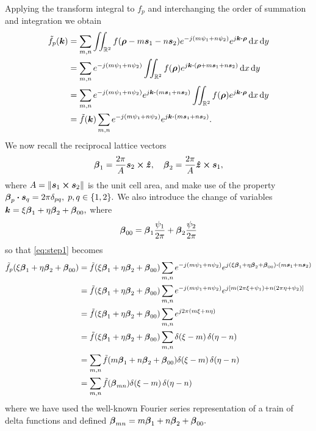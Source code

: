 Applying the transform integral to $f_p$ and interchanging the order
of summation and integration we obtain
\begin{align}
  \tilde{f}_p(\boldsymbol{k}) &= 
  \sum_{m,n} \iint_{\mathbb{R}^2} f(\boldsymbol{\rho}-m\boldsymbol{s}_1-n\boldsymbol{s}_2)
  e^{-j(m\psi_1+n\psi_2)} e^{j\boldsymbol{k}\boldsymbol{\cdot}\boldsymbol{\rho}}
  \, \text{d} x \, \text{d} y  \nonumber \\
  &= \sum_{m,n} e^{-j(m\psi_1+n\psi_2)} \iint_{\mathbb{R}^2} f(\boldsymbol{\rho})
  e^{j\boldsymbol{k}\boldsymbol{\cdot}(\boldsymbol{\rho}+m\boldsymbol{s}_1+n\boldsymbol{s}_2)}
  \, \text{d} x \, \text{d} y  \nonumber \\
  &= \sum_{m,n} e^{-j(m\psi_1+n\psi_2)} 
  e^{j\boldsymbol{k}\boldsymbol{\cdot}(m\boldsymbol{s}_1+n\boldsymbol{s}_2)}
  \iint_{\mathbb{R}^2} f(\boldsymbol{\rho})
  e^{j\boldsymbol{k}\boldsymbol{\cdot}\boldsymbol{\rho}}
  \, \text{d} x \, \text{d} y  \nonumber \\
  &= \tilde{f}(\boldsymbol{k}) \sum_{m,n} e^{-j(m\psi_1+n\psi_2)} 
  e^{j\boldsymbol{k}\boldsymbol{\cdot}(m\boldsymbol{s}_1+n\boldsymbol{s}_2)}.  \label{eq:step1}
\end{align}
We now recall the reciprocal lattice vectors 
\begin{equation}
  \boldsymbol{\beta}_1 = \frac{2\pi}{A} \boldsymbol{s}_2\boldsymbol{\times}\boldsymbol{\hat{z}}, \quad
  \boldsymbol{\beta}_2 = \frac{2\pi}{A} \boldsymbol{\hat{z}} \boldsymbol{\times} \boldsymbol{s}_1,
\end{equation}
where $A = \left\lVert\boldsymbol{s}_1 \boldsymbol{\times} \boldsymbol{s}_2\right\rVert$  is the unit cell area, and make
use of the property $\boldsymbol{\beta}_p \boldsymbol{\cdot} \boldsymbol{s}_q = 2\pi \delta_{pq}, \; p,q
\in \{1,2\}.$  We also introduce the change of variables $\boldsymbol{k} = \xi
\boldsymbol{\beta}_1 + \eta \boldsymbol{\beta}_2 + \boldsymbol{\beta}_{00},$ where
\begin{equation}
  \boldsymbol{\beta}_{00} = \boldsymbol{\beta}_1\frac{\psi_1}{2\pi}  + \boldsymbol{\beta}_2\frac{\psi_2}{2\pi} 
\end{equation}
 so that \eqref{eq:step1} becomes
\begin{align}
  \tilde{f}_p(\xi\boldsymbol{\beta}_1 + \eta\boldsymbol{\beta}_2 + \boldsymbol{\beta}_{00}) 
  &= \tilde{f}(\xi\boldsymbol{\beta}_1 + \eta\boldsymbol{\beta}_2 + \boldsymbol{\beta}_{00})  
  \sum_{m,n} e^{-j(m\psi_1+n\psi_2)} 
  e^{j(\xi\boldsymbol{\beta}_1 + \eta\boldsymbol{\beta}_2 + \boldsymbol{\beta}_{00})\boldsymbol{\cdot}(m\boldsymbol{s}_1+n\boldsymbol{s}_2)}
  \nonumber \\
  &= \tilde{f}(\xi\boldsymbol{\beta}_1 + \eta\boldsymbol{\beta}_2 + \boldsymbol{\beta}_{00})  
  \sum_{m,n} e^{-j(m\psi_1+n\psi_2)} 
  e^{j[m(2\pi\xi+\psi_1) + n(2\pi\eta+\psi_2)]}
   \nonumber \\
  &= \tilde{f}(\xi\boldsymbol{\beta}_1 + \eta\boldsymbol{\beta}_2+\boldsymbol{\beta}_{00})  
  \sum_{m,n} 
  e^{j2\pi(m\xi + n\eta)} \nonumber \\
  &= \tilde{f}(\xi\boldsymbol{\beta}_1 + \eta\boldsymbol{\beta}_2 + \boldsymbol{\beta}_{00})  
  \sum_{m,n} 
  \delta(\xi - m) \, \delta(\eta-n) \nonumber \\
  &=   \sum_{m,n} 
  \tilde{f}(m\boldsymbol{\beta}_1 + n\boldsymbol{\beta}_2 + \boldsymbol{\beta}_{00})  
  \delta(\xi - m) \, \delta(\eta-n) \nonumber \\
  &=   \sum_{m,n} 
  \tilde{f}(\boldsymbol{\beta}_{mn})  
  \delta(\xi - m) \, \delta(\eta-n)
  \label{eq:step3}
\end{align}
where we have used the well-known Fourier series representation of a
train of delta functions and defined $\boldsymbol{\beta}_{mn} = m\boldsymbol{\beta}_1 +
n\boldsymbol{\beta}_2 + \boldsymbol{\beta}_{00}.$

